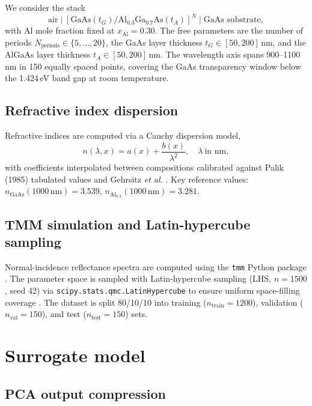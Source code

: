 \documentclass[9pt,twocolumn]{optica-article}
\begin{document}
We consider the stack
\begin{equation}
  \text{air} \mid [\text{GaAs}(t_G) / \text{Al}_{0.3}\text{Ga}_{0.7}\text{As}(t_A)]^N
  \mid \text{GaAs substrate},
\end{equation}
with Al mole fraction fixed at $x_\mathrm{Al}=0.30$.
The free parameters are the number of periods
$N_\mathrm{periods}\in\{5,\dots,20\}$, the GaAs layer thickness
$t_G\in[50,200]$\,nm, and the AlGaAs layer thickness
$t_A\in[50,200]$\,nm.
The wavelength axis spans 900--1100\,nm in 150 equally spaced points, covering the
GaAs transparency window below the 1.424\,eV band gap at room temperature.

\subsection{Refractive index dispersion}

Refractive indices are computed via a Cauchy dispersion model,
\begin{equation}
  n(\lambda, x) = a(x) + \frac{b(x)}{\lambda^2},
  \quad \lambda\ \text{in nm},
\end{equation}
with coefficients interpolated between compositions calibrated against Palik
(1985) tabulated values \cite{Palik1985} and Gehrsitz \textit{et al.}
\cite{Gehrsitz2000}.
Key reference values: $n_\mathrm{GaAs}(1000\,\text{nm})=3.539$,
$n_{\mathrm{Al}_{0.3}}(1000\,\text{nm})=3.281$.

\subsection{TMM simulation and Latin-hypercube sampling}

Normal-incidence reflectance spectra are computed using the \texttt{tmm} Python
package \cite{Byrnes2020}.
The parameter space is sampled with Latin-hypercube sampling (LHS,
$n=1500$, seed 42) via \texttt{scipy.stats.qmc.LatinHypercube} to ensure
uniform space-filling coverage \cite{McKay1979}.
The dataset is split 80/10/10 into training ($n_\mathrm{train}=1200$),
validation ($n_\mathrm{val}=150$), and test ($n_\mathrm{test}=150$) sets.


\section{Surrogate model}

\subsection{PCA output compression}
\end{document}
